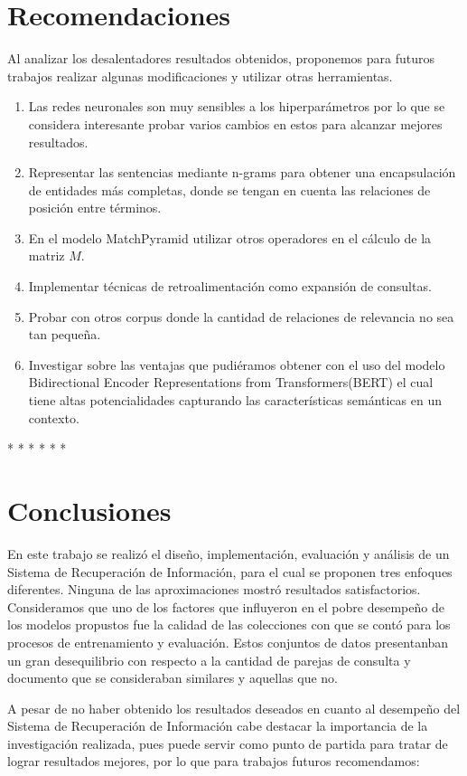 \documentclass{llncs}
\begin{document}
\section{Recomendaciones}

Al analizar los desalentadores resultados obtenidos, proponemos para futuros trabajos realizar algunas modificaciones y utilizar otras herramientas.

\begin{enumerate}
	\item Las redes neuronales son muy sensibles a los hiperparámetros por lo que se considera interesante probar varios cambios en estos para alcanzar mejores resultados.
	\item Representar las sentencias mediante n-grams para obtener una encapsulación de entidades más completas, donde se tengan en cuenta las relaciones de posición entre términos.
	\item En el modelo MatchPyramid utilizar otros operadores en el cálculo de la matriz $M$.
	\item Implementar técnicas de retroalimentación como expansión de consultas. 
	\item Probar con otros corpus donde la cantidad de relaciones de relevancia no sea tan pequeña.
	\item Investigar sobre las ventajas que pudiéramos obtener con el uso del modelo Bidirectional Encoder Representations from Transformers(BERT) el cual tiene altas potencialidades capturando las características semánticas en un contexto.
\end{enumerate}
* 
* 
* 
* 
* 
* 

\section{Conclusiones}
 
 En este trabajo se realizó  el diseño, implementación, evaluación y análisis de un Sistema de Recuperación de Información, para el cual se proponen tres enfoques diferentes. Ninguna de las aproximaciones mostró resultados satisfactorios. Consideramos que uno de los factores que influyeron en el pobre desempeño de los modelos propustos fue la calidad de las colecciones con que se contó para los procesos de entrenamiento y evaluación. Estos conjuntos de datos presentanban un gran desequilibrio con respecto a la cantidad de parejas de consulta y documento que se consideraban similares y aquellas que no.
 
 A pesar de no haber obtenido los resultados deseados en cuanto al desempeño del Sistema de Recuperación de Información cabe destacar  la importancia de la investigación realizada, pues puede servir como punto de partida para tratar de lograr resultados mejores, por lo que para trabajos futuros recomendamos:
\end{document}
